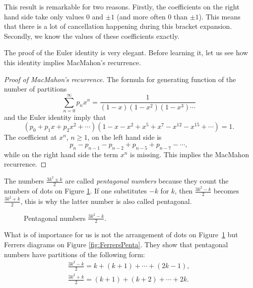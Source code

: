 \begin{page}
\setcounter{section}{3}
\setcounter{subsection}{8}
\setcounter{dfn}{20}
\label{portion:953}


This result is remarkable for two reasons.
Firstly, the coefficients on the right hand side take only values $0$ and $\pm 1$ (and more often $0$ than $\pm 1$).
This means that there is a lot of cancellation happening during this bracket expansion.
Secondly, we know the values of these coefficients exactly.

The proof of the Euler identity is very elegant.
Before learning it, let us see how this identity implies MacMahon's recurrence.

\begin{proof}[Proof of MacMahon's recurrence]
The formula for generating function of the number of partitions
\[
\sum_{n=0}^\infty p_n x^n = \frac{1}{(1-x)(1-x^2)(1-x^3) \cdots}
\]
and the Euler identity imply that
\[
(p_0 + p_1 x + p_2 x^2 + \cdots)(1 - x - x^2 + x^5 + x^7 - x^{12} - x^{15} + \cdots) = 1.
\]
The coefficient at $x^n$, $n \ge 1$, on the left hand side is
\[
p_n - p_{n-1} - p_{n-2} + p_{n-5} + p_{n-7} - \cdots,
\]
while on the right hand side the term $x^n$ is missing.
This implies the MacMahon recurrence.
\end{proof}


The numbers $\frac{3k^2 \pm k}{2}$ are called \emph{pentagonal numbers}
because they count the numbers of dots on Figure \ref{fig:PentaNumber}.
If one substitutes $-k$ for $k$, then $\frac{3k^2 - k}{2}$ becomes $\frac{3k^2 + k}{2}$,
this is why the latter number is also called pentagonal.

\begin{figure}[ht]
\begin{center}

\end{center}
\caption{Pentagonal numbers $\frac{3k^2 - k}{2}$.}
\label{fig:PentaNumber}
\end{figure}

What is of importance for us is not the arrangement of dots on Figure~\ref{fig:PentaNumber}
but Ferrers diagrams on Figure \ref{fig:FerrersPenta}.
They show that pentagonal numbers have partitions of the following form:
\begin{gather*}
\frac{3k^2-k}{2} = k + (k+1) + \cdots + (2k-1),\\
\frac{3k^2+k}{2} = (k+1) + (k+2) + \cdots + 2k.
\end{gather*}


\end{page}

